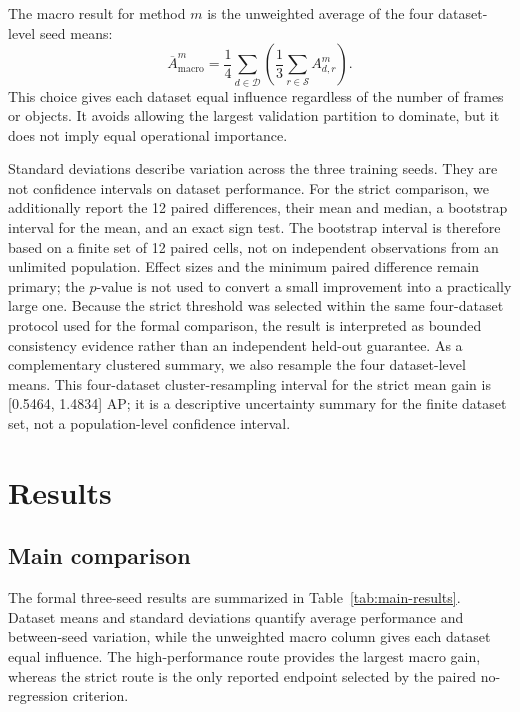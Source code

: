 \documentclass[preprint,12pt,times]{elsarticle}
\newcommand{\tabref}[1]{\textcolor{floatreviewblue}{Table~\ref{#1}}}
\newcommand{\tabref}[1]{Table~\ref{#1}}
\begin{document}
The macro result for method $m$ is the unweighted average of the four
dataset-level seed means:
\begin{equation}
\overline A_{\mathrm{macro}}^m =
\frac{1}{4}\sum_{d\in\mathcal{D}}
\left(\frac{1}{3}\sum_{r\in\mathcal{S}} A_{d,r}^m\right).
\end{equation}
This choice gives each dataset equal influence regardless of the number of
frames or objects. It avoids allowing the largest validation partition to
dominate, but it does not imply equal operational importance.

Standard deviations describe variation across the three training seeds. They
are not confidence intervals on dataset performance. For the strict
comparison, we additionally report the 12 paired differences, their mean and
median, a bootstrap interval for the mean, and an exact sign test. The
bootstrap interval is therefore based on a finite set of 12 paired cells, not
on independent observations from an unlimited population. Effect sizes and
the minimum paired difference remain primary; the $p$-value is not used to
convert a small improvement into a practically large one. Because the strict
threshold was selected within the same four-dataset protocol used for the
formal comparison, the result is interpreted as bounded consistency evidence
rather than an independent held-out guarantee. As a complementary clustered
summary, we also resample the four dataset-level means. This four-dataset
cluster-resampling interval for the strict mean gain is [0.5464, 1.4834] AP;
it is a descriptive uncertainty summary for the finite dataset set, not a
population-level confidence interval.

\section{Results}
\label{sec:results}

\subsection{Main comparison}

The formal three-seed results are summarized in
\tabref{tab:main-results}. Dataset means and standard deviations quantify
average performance and between-seed variation, while the unweighted macro
column gives each dataset equal influence. The high-performance route provides
the largest macro gain, whereas the strict route is the only reported endpoint
selected by the paired no-regression criterion.
\end{document}

